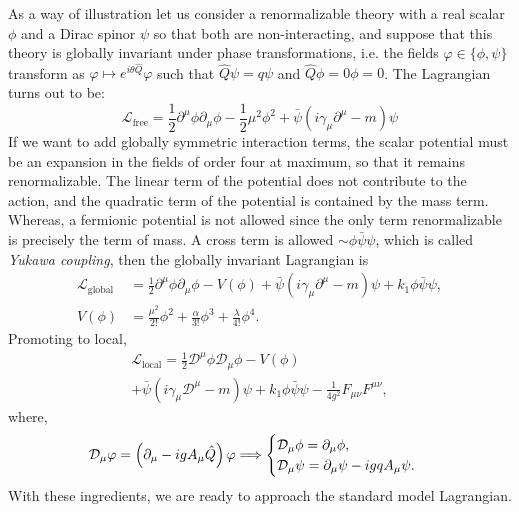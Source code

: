 As a way of illustration let us consider a renormalizable theory with a real scalar $\phi$ and a  Dirac spinor $\psi$ so that both are non-interacting, and suppose that this theory is globally invariant under phase transformations, i.e. the fields $\varphi\in\{\phi,\psi\}$ transform as $\varphi\mapsto e^{i\theta \hat Q}\varphi $ such that $\hat Q \psi = q \psi$ and $\hat Q \phi=0\phi=0$. The Lagrangian turns out to be: 
\begin{equation}
	\mathcal L_{\text{free}}=\frac{1}{2} \partial^{\mu} \phi \partial_{\mu} \phi-\frac{1}{2}\mu^2\phi^2+\bar{\psi}(i \gamma_\mu  \partial^\mu-m) \psi
\end{equation}
If we want to add globally symmetric interaction terms, the scalar potential must be an expansion in the fields of order four at maximum, so that it remains renormalizable. The linear term of the potential does not contribute to the action, and the quadratic term of the potential is contained by the mass term. Whereas, a fermionic potential is not allowed since the only term renormalizable is precisely the term of mass. A cross term is allowed $\sim \phi\bar\psi\psi$, which is called \textit{Yukawa coupling}, then the globally invariant Lagrangian is
\begin{equation}
	\begin{aligned}
		\mathcal L_{\text{global}}&=\frac{1}{2} \partial^{\mu} \phi \partial_{\mu} \phi-V(\phi)+\bar{\psi}(i \gamma_\mu  \partial^\mu-m) \psi + k_1 \phi\bar\psi\psi,
		\\
		V(\phi)&=\frac{\mu^2}{2!}\phi^2 +\frac{\alpha}{3!}\phi^3+\frac{\lambda}{4!}\phi^4.
	\end{aligned}
\end{equation}
Promoting to local, 
\begin{multline}
	\mathcal L_{\text{local}}=\frac{1}{2} \mathcal D^{\mu} \phi \mathcal D_{\mu} \phi-V(\phi)\\
	+\bar{\psi}(i \gamma_\mu  \mathcal D^{\mu}-m) \psi 
	+ k_1 \phi\bar\psi\psi-\frac1{4g^2} F_{\mu\nu}F^{\mu\nu},
\end{multline}
where, 
\begin{equation}
	\mathcal D_\mu\varphi=\fac{\partial_{\mu}-ig A_\mu\hat Q }\varphi
	\Longrightarrow
	\begin{cases}
		\mathcal D_\mu\phi=\partial_\mu \phi,\\
		\mathcal D_\mu\psi=\partial_\mu \psi-ig q A_\mu \psi.
	\end{cases}
\end{equation}
With these ingredients, we are ready to approach the standard model Lagrangian. 

